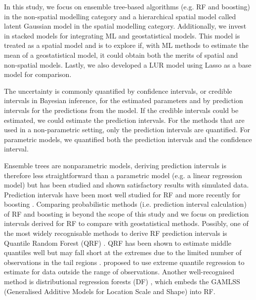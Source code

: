 \documentclass{article}
\begin{document}
In this study, we focus on ensemble tree-based algorithms (e.g. RF and boosting) in the non-spatial modelling category and a hierarchical spatial model \citep{lindgren2015bayesian, blangiardo2015spatial,moraga2019} called latent Gaussian model in the spatial modelling category. Additionally, we invest in stacked models for integrating ML and  geostatistical  models. This model is treated as a spatial model and is to explore if, with ML methods to estimate the mean of a geostatistical model, it could obtain both the merits of spatial and non-spatial models. Lastly, we also developed a LUR model using Lasso as a base model for comparison.  

The uncertainty is commonly quantified by confidence intervals, or credible intervals in Bayesian inference, for the estimated parameters and by prediction intervals for the predictions from the model. If the credible intervals could be estimated, we could estimate the prediction intervals. For the methods that are used in a non-parametric setting, only the prediction intervals are quantified. For parametric models, we quantified both the prediction intervals and the confidence interval.  

Ensemble trees are nonparametric models, deriving prediction intervals is therefore less straightforward than a parametric model (e.g. a linear regression model) but has been studied and shown satisfactory results with simulated data. Prediction intervals have been most well studied for RF \citep{meinshausen2006quantile,wager2014confidence,stasinopoulos2007generalized,alakus2021rfpredinterval} and more recently for boosting \citep{duan2020ngboost,velthoen2021gradient}. Comparing probabilistic methods (i.e. prediction interval calculation) of RF and boosting is beyond the scope of this study and we focus on prediction intervals derived for RF to compare with geostatistical methods. Possibly, one of the most widely recognisable methods to derive RF prediction intervals is Quantile Random Forest (QRF) \citep{meinshausen2006quantile}. QRF has been shown to estimate middle quantiles well but may fall short at the extremes due to the limited number of observations in the tail regions \citep{velthoen2021gradient}. \cite{velthoen2021gradient} proposed to use extreme quantile regression to estimate for data outside the range of observations. Another well-recognised method is distributional regression forests (DF) \citep{schlosser2019distributional}, which embeds the GAMLSS (Generalised Additive Models for Location Scale and Shape) \citep{stasinopoulos2007generalized} into RF.  
\end{document}
